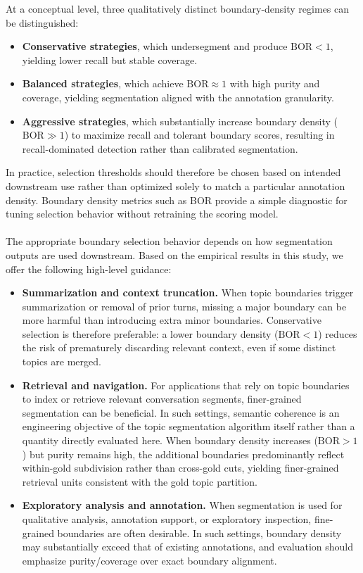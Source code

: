 \documentclass{article}
\makeatletter
\newcommand{\myparagraph}[1]{%
  \paragraph{\@addpunct{#1}}%
}
\makeatother
\begin{document}
At a conceptual level, three qualitatively distinct boundary-density
regimes can be distinguished:
\begin{itemize}
\item \textbf{Conservative strategies}, which undersegment and produce
  $\text{BOR} < 1$, yielding lower recall but stable coverage.
\item \textbf{Balanced strategies}, which achieve $\text{BOR} \approx
  1$ with high purity and coverage, yielding segmentation aligned with
  the annotation granularity.
\item \textbf{Aggressive strategies}, which substantially increase
  boundary density ($\text{BOR} \gg 1$) to maximize recall and tolerant
  boundary scores, resulting in recall-dominated detection rather than
  calibrated segmentation.
\end{itemize}



In practice, selection thresholds should therefore be chosen based on
intended downstream use rather than optimized solely to match a
particular annotation density. Boundary density metrics such as BOR
provide a simple diagnostic for tuning selection behavior without
retraining the scoring model.

\myparagraph{Practical guidance for choosing boundary density}
The appropriate boundary selection behavior depends on how segmentation
outputs are used downstream. Based on the empirical results in this
study, we offer the following high-level guidance:

\begin{itemize}
\item \textbf{Summarization and context truncation.}
  When topic boundaries trigger summarization or removal of prior
  turns, missing a major boundary can be more harmful than introducing
  extra minor boundaries. Conservative selection is therefore
  preferable: a lower boundary density ($\text{BOR} < 1$) reduces the
  risk of prematurely discarding relevant context, even if some
  distinct topics are merged.

\item \textbf{Retrieval and navigation.}
  For applications that rely on topic boundaries to index or retrieve
  relevant conversation segments, finer-grained segmentation can be
  beneficial. In such settings, semantic coherence is an engineering
  objective of the topic segmentation algorithm itself rather than a
  quantity directly evaluated here. When boundary density increases
  ($\text{BOR} > 1$) but purity remains high, the additional boundaries
  predominantly reflect within-gold subdivision rather than cross-gold
  cuts, yielding finer-grained retrieval units consistent with the gold
  topic partition.

\item \textbf{Exploratory analysis and annotation.}
  When segmentation is used for qualitative analysis, annotation
  support, or exploratory inspection, fine-grained boundaries are
  often desirable. In such settings, boundary density may substantially
  exceed that of existing annotations, and evaluation should emphasize
  purity/coverage over exact boundary alignment.
\end{itemize}
\end{document}
